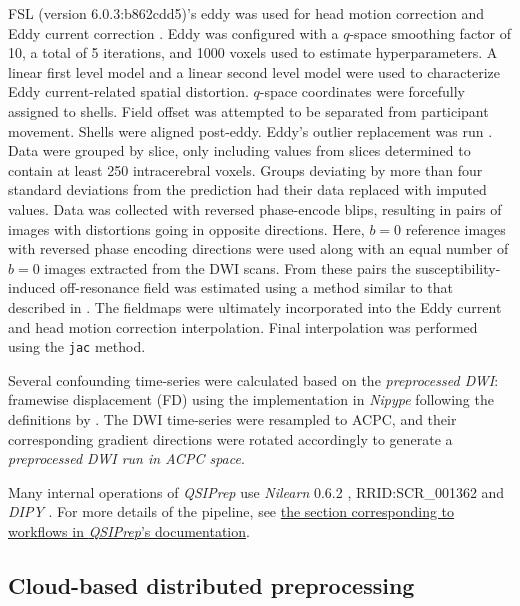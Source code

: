 \documentclass[fleqn,10pt,inline]{wlscirep}
\begin{document}
\begin{itemize}
FSL (version 6.0.3:b862cdd5)'s eddy was used for head motion correction
and Eddy current correction \cite{anderssoneddy}. Eddy was configured
with a \(q\)-space smoothing factor of 10, a total of 5 iterations, and
\num{1000} voxels used to estimate hyperparameters. A linear first level model
and a linear second level model were used to characterize Eddy
current-related spatial distortion. \(q\)-space coordinates were
forcefully assigned to shells. Field offset was attempted to be
separated from participant movement. Shells were aligned post-eddy. Eddy's
outlier replacement was run \cite{eddyrepol}. Data were grouped by
slice, only including values from slices determined to contain at least
\num{250} intracerebral voxels. Groups deviating by more than four standard
deviations from the prediction had their data replaced with imputed
values. Data was collected with reversed phase-encode blips, resulting
in pairs of images with distortions going in opposite directions. Here,
$b=0$ reference images with reversed phase encoding directions were used
along with an equal number of $b=0$ images extracted from the DWI scans.
From these pairs the susceptibility-induced off-resonance field was
estimated using a method similar to that described in \cite{topup}. The
fieldmaps were ultimately incorporated into the Eddy current and head
motion correction interpolation. Final interpolation was performed using
the \texttt{jac} method.

Several confounding time-series were calculated based on the
\emph{preprocessed DWI}: framewise displacement (FD) using the implementation
in \emph{Nipype} following the definitions by \cite{power-fd-dvars}. The DWI
time-series were resampled to ACPC, and their corresponding gradient directions
were rotated accordingly to generate a \emph{preprocessed DWI run
in ACPC space}. 

\end{itemize}

\noindent Many internal operations of \emph{QSIPrep} use \emph{Nilearn} 0.6.2
\cite{nilearn}, RRID:SCR\_001362 and \emph{DIPY} \cite{dipy}. For more details
of the pipeline, see
\href{https://qsiprep.readthedocs.io/en/latest/workflows.html}{the section
corresponding to workflows in \emph{QSIPrep}'s documentation}.

\subsection*{Cloud-based distributed preprocessing}
\end{document}
